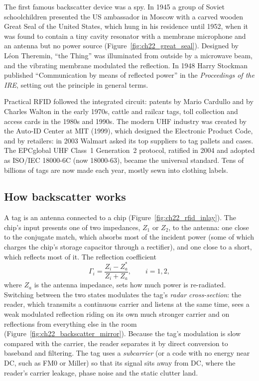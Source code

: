 \begin{history}
The first famous backscatter device was a spy. In 1945 a group of Soviet schoolchildren presented the
US ambassador in Moscow with a carved wooden Great Seal of the United States, which hung in his
residence until 1952, when it was found to contain a tiny cavity resonator with a membrane microphone
and an antenna but no power source (Figure~\ref{fig:ch22_great_seal}). Designed by Léon Theremin,
``the Thing'' was illuminated from outside by a microwave beam, and the vibrating membrane modulated
the reflection. In 1948 Harry Stockman published ``Communication by means of reflected power'' in the
\emph{Proceedings of the IRE}, setting out the principle in general terms.

Practical RFID followed the integrated circuit: patents by Mario Cardullo and by Charles Walton in the
early 1970s, cattle and railcar tags, toll collection and access cards in the 1980s and 1990s. The
modern UHF industry was created by the Auto-ID Center at MIT (1999), which designed the Electronic
Product Code, and by retailers: in 2003 Walmart asked its top suppliers to tag pallets and cases. The
EPCglobal UHF Class~1 Generation~2 protocol, ratified in 2004 and adopted as ISO/IEC 18000-6C (now
18000-63), became the universal standard. Tens of billions of tags are now made each year, mostly sewn
into clothing labels.
\end{history}

\subsection{How backscatter works}

A tag is an antenna connected to a chip (Figure~\ref{fig:ch22_rfid_inlay}). The chip's input presents one of two impedances, $Z_1$ or
$Z_2$, to the antenna: one close to the conjugate match, which absorbs most of the incident power
(some of which charges the chip's storage capacitor through a rectifier), and one close to a short,
which reflects most of it. The reflection coefficient
\begin{equation}
\Gamma_i=\frac{Z_i-Z_a^*}{Z_i+Z_a},\qquad i=1,2,
\label{eq:ch22:gamma}
\end{equation}
where $Z_a$ is the antenna impedance, sets how much power is re-radiated. Switching between the two
states modulates the tag's \emph{radar cross-section}: the reader, which transmits a continuous
carrier and listens at the same time, sees a weak modulated reflection riding on its own much stronger
carrier and on reflections from everything else in the room (Figure~\ref{fig:ch22_backscatter_mirror}).
Because the tag's modulation is slow compared with the carrier, the reader separates it by direct
conversion to baseband and filtering. The tag uses a \emph{subcarrier} (or a code with no energy near
DC, such as FM0 or Miller) so that its signal sits away from DC, where the reader's carrier leakage,
phase noise and the static clutter land.

